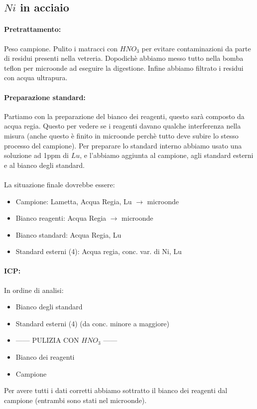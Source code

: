 \documentclass{article}
\begin{document}
\subsection{$Ni$ in acciaio}
\paragraph{Pretrattamento:} Peso campione. Pulito i matracci con $HNO_3$ per evitare contaminazioni da parte di residui presenti nella vetreria. Dopodichè abbiamo messo tutto nella bomba teflon per microonde ad eseguire la digestione. Infine abbiamo filtrato i residui con acqua ultrapura.

\paragraph{Preparazione standard:} Partiamo con la preparazione del bianco dei reagenti, questo sarà composto da acqua regia. Questo per vedere se i reagenti davano qualche interferenza nella misura (anche questo è finito in microonde perchè tutto deve subire lo stesso processo del campione). Per preparare lo standard interno abbiamo usato una soluzione ad 1ppm di $Lu$, e l'abbiamo aggiunta al campione, agli standard esterni e al bianco degli standard.
\\\\
La situazione finale dovrebbe essere:
\begin{itemize}
	\item Campione: Lametta, Acqua Regia, Lu $\rightarrow$ microonde
	\item Bianco reagenti: Acqua Regia $\rightarrow$ microonde
	\item Bianco standard: Acqua Regia, Lu
	\item Standard esterni (4): Acqua regia, conc. var. di Ni, Lu 
\end{itemize}

\paragraph{ICP:} In ordine di analisi:
\begin{itemize}
	\item Bianco degli standard
	\item Standard esterni (4) (da conc. minore a maggiore)
	\item ------ PULIZIA CON $HNO_3$ ------ 
	\item Bianco dei reagenti
	\item Campione
\end{itemize}
%
Per avere tutti i dati corretti abbiamo sottratto il bianco dei reagenti dal campione (entrambi sono stati nel microonde).
\end{document}
